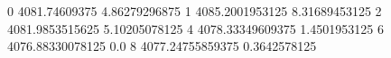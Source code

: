0 4081.74609375 4.86279296875
1 4085.2001953125 8.31689453125
2 4081.9853515625 5.10205078125
4 4078.33349609375 1.4501953125
6 4076.88330078125 0.0
8 4077.24755859375 0.3642578125
